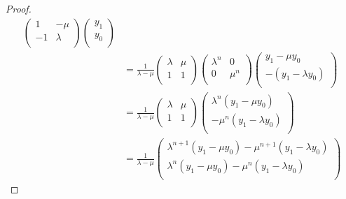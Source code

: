 \documentclass[../psets.tex]{subfiles}
\begin{document}
\begin{enumerate}
\begin{enumerate}
\begin{proof}
\begin{align*}
                \begin{pmatrix}
                    1 & -\mu\\
                    -1 & \lambda\\
                \end{pmatrix}
                \begin{pmatrix}
                    y_1\\
                    y_0\\
                \end{pmatrix}\\
                &= \frac{1}{\lambda-\mu}
                \begin{pmatrix}
                    \lambda & \mu\\
                    1 & 1\\
                \end{pmatrix}
                \begin{pmatrix}
                    \lambda^n & 0\\
                    0 & \mu^n\\
                \end{pmatrix}
                \begin{pmatrix}
                    y_1-\mu y_0\\
                    -(y_1-\lambda y_0)\\
                \end{pmatrix}\\
                &= \frac{1}{\lambda-\mu}
                \begin{pmatrix}
                    \lambda & \mu\\
                    1 & 1\\
                \end{pmatrix}
                \begin{pmatrix}
                    \lambda^n(y_1-\mu y_0)\\
                    -\mu^n(y_1-\lambda y_0)\\
                \end{pmatrix}\\
                &= \frac{1}{\lambda-\mu}
                \begin{pmatrix}
                    \lambda^{n+1}(y_1-\mu y_0)-\mu^{n+1}(y_1-\lambda y_0)\\
                    \lambda^n(y_1-\mu y_0)-\mu^n(y_1-\lambda y_0)\\
                \end{pmatrix}

\end{align*}
\end{proof}
\end{enumerate}
\end{enumerate}
\end{document}
